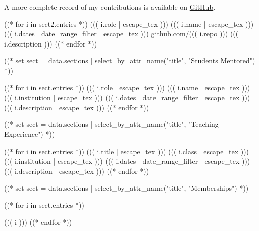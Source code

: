 \documentclass[10pt, letterpaper]{awesome-cv}
\begin{document}
A more complete record of my contributions is available on 
\href{https://github.com/((( data.preamble.contact.github )))}
     {GitHub}.
\begin{cventries}
((* for i in sect2.entries *))
\cventry
  {((( i.role | escape_tex )))}
  {((( i.name | escape_tex )))}
  {((( i.dates | date_range_filter | escape_tex )))}
  {\href{https://github.com/((( i.repo )))}{github.com/((( i.repo )))}}
  {((( i.description )))}
((* endfor *))
\end{cventries}

((* set sect = data.sections | select_by_attr_name("title", "Students Mentored") *))
\begin{cventries}
((* for i in sect.entries *))
\cventry
  {((( i.role | escape_tex )))}
  {((( i.name | escape_tex )))}
  {((( i.institution | escape_tex )))}
  {((( i.dates | date_range_filter | escape_tex )))}
  {((( i.description | escape_tex )))}
((* endfor *))
\end{cventries}
((* set sect = data.sections | select_by_attr_name("title", "Teaching Experience") *))
\begin{cventries}
((* for i in sect.entries *))
\cventry
  {((( i.title | escape_tex )))}
  {((( i.class | escape_tex )))}
  {((( i.institution | escape_tex )))}
  {((( i.dates | date_range_filter | escape_tex )))}
  {((( i.description | escape_tex )))}
((* endfor *))
\end{cventries}

((* set sect = data.sections | select_by_attr_name("title", "Memberships") *))
\begin{cventries}
\begin{cvitems}
  ((* for i in sect.entries *))
  \item{((( i )))}
  ((* endfor *))
\end{cvitems}
\vspace{1em}
\end{cventries}

\end{document}
